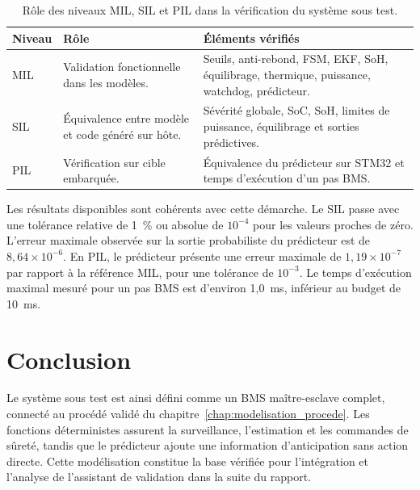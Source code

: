 \begin{table}[H]
  \centering
  \small
  \begin{tabularx}{\textwidth}{|l|X|X|}
    \hline
    \textbf{Niveau} & \textbf{Rôle} & \textbf{Éléments vérifiés} \\
    \hline
    MIL & Validation fonctionnelle dans les modèles. & Seuils, anti-rebond, FSM, EKF, SoH, équilibrage, thermique, puissance, watchdog, prédicteur. \\
    \hline
    SIL & Équivalence entre modèle et code généré sur hôte. & Sévérité globale, SoC, SoH, limites de puissance, équilibrage et sorties prédictives. \\
    \hline
    PIL & Vérification sur cible embarquée. & Équivalence du prédicteur sur STM32 et temps d'exécution d'un pas BMS. \\
    \hline
  \end{tabularx}
  \captionsetup{width=0.88\textwidth, skip=15pt}
  \caption{Rôle des niveaux MIL, SIL et PIL dans la vérification du système sous test.}
  \label{tab:ch4_synthese_mil_sil_pil}
\end{table}

\noindent
Les résultats disponibles sont cohérents avec cette démarche. Le SIL passe avec une tolérance relative de 1~\% ou absolue de $10^{-4}$ pour les valeurs proches de zéro. L'erreur maximale observée sur la sortie probabiliste du prédicteur est de $8{,}64\times10^{-6}$. En PIL, le prédicteur présente une erreur maximale de $1{,}19\times10^{-7}$ par rapport à la référence MIL, pour une tolérance de $10^{-3}$. Le temps d'exécution maximal mesuré pour un pas BMS est d'environ 1{,}0~ms, inférieur au budget de 10~ms.

\section{Conclusion}
\label{sec:ch4_conclusion}

Le système sous test est ainsi défini comme un BMS maître-esclave complet, connecté au procédé validé du chapitre~\ref{chap:modelisation_procede}. Les fonctions déterministes assurent la surveillance, l'estimation et les commandes de sûreté, tandis que le prédicteur ajoute une information d'anticipation sans action directe. Cette modélisation constitue la base vérifiée pour l'intégration et l'analyse de l'assistant de validation dans la suite du rapport.